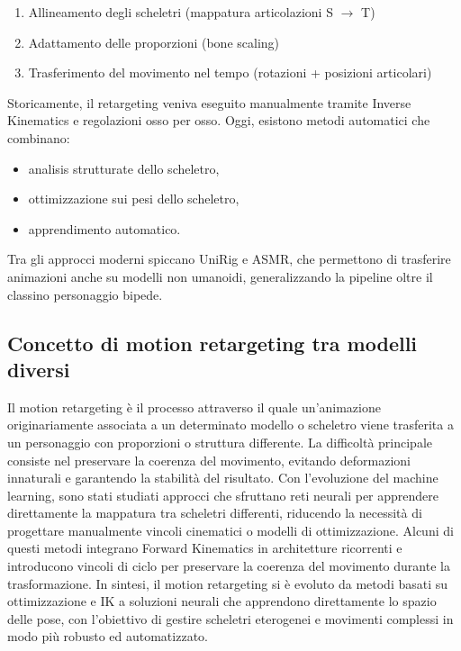 \begin{itemize}
\begin{enumerate}
    \item Allineamento degli scheletri (mappatura articolazioni S $\rightarrow$ T)
    \item Adattamento delle proporzioni (bone scaling)
    \item Trasferimento del movimento nel tempo (rotazioni + posizioni articolari)
\end{enumerate}

Storicamente, il retargeting veniva eseguito manualmente tramite Inverse Kinematics e regolazioni osso per osso.
Oggi, esistono metodi automatici che combinano:
\begin{itemize}
    \item analisis strutturate dello scheletro,
    \item ottimizzazione sui pesi dello scheletro,
    \item apprendimento automatico.
\end{itemize}

Tra gli approcci moderni spiccano UniRig e ASMR, che permettono di trasferire animazioni anche su modelli non umanoidi, generalizzando la pipeline oltre il classino personaggio bipede.

\subsection{Concetto di motion retargeting tra modelli diversi}
Il motion retargeting è il processo attraverso il quale un'animazione originariamente associata a un determinato modello o scheletro viene trasferita a un personaggio con proporzioni o struttura differente. La difficoltà principale consiste nel preservare la coerenza del movimento, evitando deformazioni innaturali e garantendo la stabilità del risultato.
Con l'evoluzione del machine learning, sono stati studiati approcci che sfruttano reti neurali per apprendere direttamente la mappatura tra scheletri differenti, riducendo la necessità di progettare manualmente vincoli cinematici o modelli di ottimizzazione. Alcuni di questi metodi integrano Forward Kinematics in architetture ricorrenti e introducono vincoli di ciclo per preservare la coerenza del movimento durante la trasformazione.
In sintesi, il motion retargeting si è evoluto da metodi basati su ottimizzazione e IK a soluzioni neurali che apprendono direttamente lo spazio delle pose, con l'obiettivo di gestire scheletri eterogenei e movimenti complessi in modo più robusto ed automatizzato.


\end{itemize}
